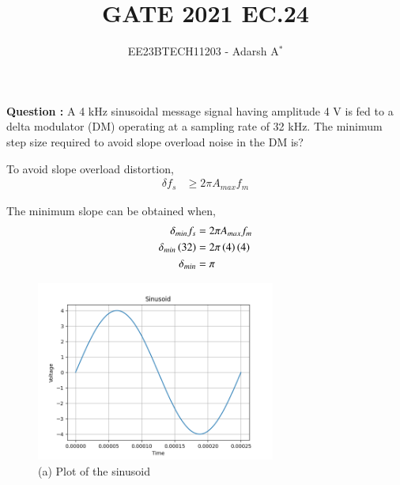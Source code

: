 \documentclass[journal,12pt,onecolumn]{IEEEtran}
\theoremstyle{remark}
\begin{document}
	
	
	\vspace{3cm}
	
	\title{GATE 2021 EC.24}
	\author{EE23BTECH11203 - Adarsh A$^{*}$%
	}
	\maketitle
	\bigskip
	
	\renewcommand{\thefigure}{\theenumi}
	\renewcommand{\thetable}{\theenumi}
	
	
	\vspace{0.2cm}
	\linespread{1.1}
	
	\textbf{Question : }
	A 4 kHz sinusoidal message signal having amplitude 4 V is fed to a delta modulator (DM) operating at a sampling rate of 32 kHz. The minimum step size required to avoid slope overload noise in the DM is?
	
	\vspace{0.3cm}
	\solution
 	\fi
	
	
	
	To avoid slope overload distortion,
	\begin{align}
		\delta f_s &\geq 2\pi A_{max} f_m
	\end{align}
	
	The minimum slope can be obtained when,
	\begin{align}
		\delta_{min} f_s &= 2\pi A_{max} f_m\\
		\delta_{min} \left(32\right) &= 2\pi \left(4\right) \left(4\right)\\
		\delta_{min} &= \pi
	\end{align}
	
	\begin{figure}[htbp]
		\centering
		\includegraphics[width=0.7\textwidth]{2021/EC/24/figs/Figure_2.png}
		\caption{(a) Plot of the sinusoid}
	\end{figure}
	
\end{document}
